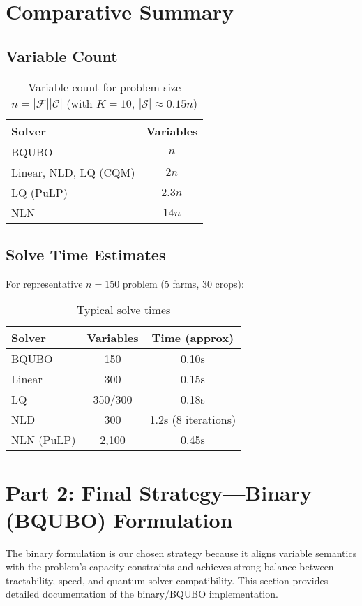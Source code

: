 \documentclass[11pt,a4paper]{article}
\begin{document}
\section{Comparative Summary}

\subsection{Variable Count}

\begin{table}[h]
\centering
\caption{Variable count for problem size $n = |\mathcal{F}||\mathcal{C}|$ (with $K=10$, $|\mathcal{S}| \approx 0.15n$)}
\begin{tabular}{lc}
\toprule
\textbf{Solver} & \textbf{Variables} \\
\midrule
BQUBO & $n$ \\
Linear, NLD, LQ (CQM) & $2n$ \\
LQ (PuLP) & $2.3n$ \\
NLN & $14n$ \\
\bottomrule
\end{tabular}
\end{table}

\subsection{Solve Time Estimates}

For representative $n = 150$ problem (5 farms, 30 crops):

\begin{table}[h]
\centering
\caption{Typical solve times}
\begin{tabular}{lcc}
\toprule
\textbf{Solver} & \textbf{Variables} & \textbf{Time (approx)} \\
\midrule
BQUBO & 150 & 0.10s \\
Linear & 300 & 0.15s \\
LQ & 350/300 & 0.18s \\
NLD & 300 & 1.2s (8 iterations) \\
NLN (PuLP) & 2,100 & 0.45s \\
\bottomrule
\end{tabular}
\end{table}

\section{Part 2: Final Strategy—Binary (BQUBO) Formulation}

The binary formulation is our chosen strategy because it aligns variable semantics with the problem's capacity constraints and achieves strong balance between tractability, speed, and quantum-solver compatibility. This section provides detailed documentation of the binary/BQUBO implementation.
\end{document}
